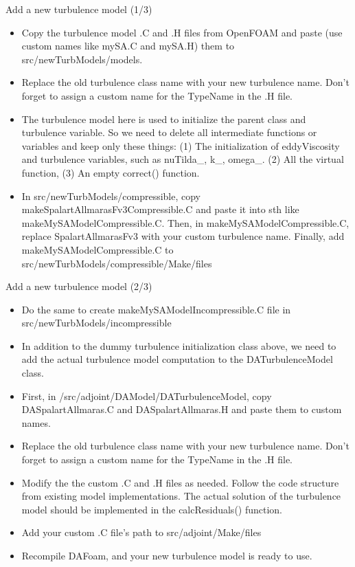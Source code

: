 \documentclass{bredelebeamer}
\begin{document}
\begin{frame}[fragile]{Add a new turbulence model (1/3)}

\begin{itemize}
  \item Copy the turbulence model .C and .H files from OpenFOAM and paste (use custom names like mySA.C and mySA.H) them to src/newTurbModels/models.
  \item Replace the old turbulence class name with your new turbulence name. Don't forget to assign a custom name for the TypeName in the .H file.
  \item The turbulence model here is used to initialize the parent class and turbulence variable. So we need to delete all intermediate functions or variables and keep only these things: (1) The initialization of eddyViscosity and turbulence variables, such as nuTilda\_, k\_, omega\_. (2) All the virtual function, (3) An empty correct() function.
  \item In src/newTurbModels/compressible, copy makeSpalartAllmarasFv3Compressible.C and paste it into sth like makeMySAModelCompressible.C. Then, in makeMySAModelCompressible.C, replace  SpalartAllmarasFv3 with your custom turbulence name. Finally, add makeMySAModelCompressible.C to src/newTurbModels/compressible/Make/files
\end{itemize}

\end{frame}

\begin{frame}[fragile]{Add a new turbulence model (2/3)}

\begin{itemize}
  \item Do the same to create makeMySAModelIncompressible.C file in src/newTurbModels/incompressible
  \item In addition to the dummy turbulence initialization class above, we need to add the actual turbulence model computation to the DATurbulenceModel class.
  \item First, in /src/adjoint/DAModel/DATurbulenceModel, copy DASpalartAllmaras.C and DASpalartAllmaras.H and paste them to custom names.
  \item Replace the old turbulence class name with your new turbulence name. Don't forget to assign a custom name for the TypeName in the .H file.
  \item Modify the the custom .C and .H files as needed. Follow the code structure from existing model implementations. The actual solution of the turbulence model should be implemented in the calcResiduals() function.
  \item Add your custom .C file's path to src/adjoint/Make/files
  \item Recompile DAFoam, and your new turbulence model is ready to use.
\end{itemize}

\end{frame}
\end{document}
